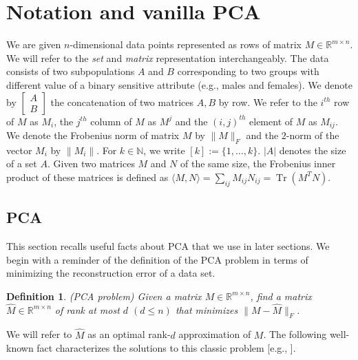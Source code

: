 \documentclass{article}
\newtheorem{definition}[theorem]{Definition} \newtheorem{claim}[theorem]{Claim}
\newcommand{\R}{\mathbb{R}}
\newcommand{\N}{\mathbb{N}}
\DeclareMathOperator{\Tr}{Tr}
\begin{document}
\section{Notation and vanilla PCA}
We are given $n$-dimensional data points represented as rows of matrix
$M \in \R^{m \times n}$. We will refer to the {\it set} and {\it
  matrix} representation interchangeably.  The data consists of two 
subpopulations $A$ and $B$ corresponding to two groups with different value of 
a binary sensitive attribute (e.g., males and females).  We denote by
\(\left[ \begin{array}{c} A \\ B \end{array} \right] \) the
concatenation of two matrices \(A,B\) by row. We refer to the $i^{th}$
row of $M$ as $M_i$, the $j^{th}$ column of $M$ as $M^j$ and the
$(i,j)^{th}$ element of $M$ as $M_{ij}$. We denote the Frobenius norm
of matrix $M$ by $\|M\|_F$ and the $2$-norm of the vector $M_i$ by
$\|M_i\|$. For 
$k\in \N$, we write $[k]:=\{1, \ldots, k\}$.
$|A|$
denotes the  size of a set $A$. Given two matrices $M$ and $N$ of the same
size, the Frobenius inner product of these matrices is defined as
$\langle M,N \rangle= \sum_{ij} M_{ij}N_{ij} = \Tr(M^TN)$.



\subsection{PCA}
This section recalls 
useful facts about PCA that we use in
later sections. We begin with a reminder of the definition of the PCA problem in
terms of minimizing the reconstruction error of a data set.

\begin{definition} (PCA problem) \label{def:fair-PCA}
 Given a matrix
  $M \in \mathbb{R}^{m \times n}$, find a matrix
  $\widehat{M} \in \R^{m \times n}$ of rank at most $d$ $(d\leq n)$
  that minimizes $\| M-\widehat{M} \|_F$.
\end{definition}

We will refer to $\widehat{M}$ as an optimal rank-$d$ approximation
of $M$. The following well-known fact characterizes the solutions to this classic problem 
[e.g., \citealp{shalev2014understanding}].
\end{document}
